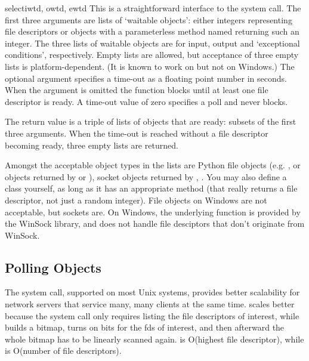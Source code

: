 \begin{funcdesc}{select}{iwtd, owtd, ewtd}
This is a straightforward interface to the \UNIX{} 
system call.  The first three arguments are lists of `waitable
objects': either integers representing file descriptors or
objects with a parameterless method named  returning
such an integer.  The three lists of waitable objects are for input,
output and `exceptional conditions', respectively.  Empty lists are
allowed, but acceptance of three empty lists is platform-dependent.
(It is known to work on \UNIX{} but not on Windows.)  The optional
 argument specifies a time-out as a floating point number
in seconds.  When the  argument is omitted the function
blocks until at least one file descriptor is ready.  A time-out value
of zero specifies a poll and never blocks.

The return value is a triple of lists of objects that are ready:
subsets of the first three arguments.  When the time-out is reached
without a file descriptor becoming ready, three empty lists are
returned.

Amongst the acceptable object types in the lists are Python file
objects (e.g. , or objects returned by
 or ), socket objects
returned by ,%
.
You may also define a  class yourself, as long as it has
an appropriate  method (that really returns a file
descriptor, not just a random integer).
  File objects on Windows are not
acceptable, but sockets are.  On Windows, the underlying
 function is provided by the WinSock library, and
does not handle file desciptors that don't originate from WinSock.
\end{funcdesc}

\subsection{Polling Objects
            \label{poll-objects}}

The  system call, supported on most Unix systems,
provides better scalability for network servers that service many,
many clients at the same time.
 scales better because the system call only
requires listing the file descriptors of interest, while 
builds a bitmap, turns on bits for the fds of interest, and then
afterward the whole bitmap has to be linearly scanned again.
 is O(highest file descriptor), while
 is O(number of file descriptors).

